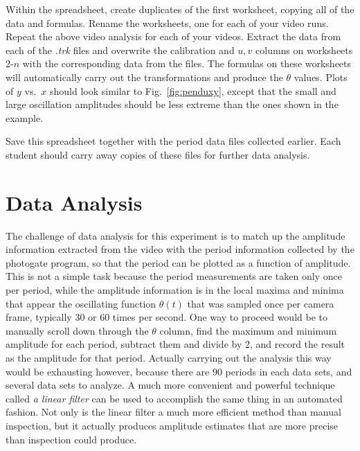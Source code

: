 \documentclass{revtex4}
\begin{document}
Within the spreadsheet, create duplicates of the first worksheet, copying
all of the data and formulas.  Rename the worksheets, one for each of your
video runs.  Repeat the above video analysis for each of your videos.
Extract the data from each of the {\em .trk} files and overwrite the
calibration and $u,v$ columns on worksheets 2-$n$ with the corresponding
data from the files.  The formulas on these worksheets will automatically
carry out the transformations and produce the $\theta$ values.  Plots of
$y$ vs.\ $x$ should look similar to Fig.~\ref{fig:penduxy}, except that
the small and large oscillation amplitudes should be less extreme than 
the ones shown in the example.

Save this spreadsheet together with the period data files collected earlier.
Each student should carry away copies of these files for further data analysis.

\section{Data Analysis}

The challenge of data analysis for this experiment is to match up the
amplitude information extracted from the video with the period information
collected by the photogate program, so that the period can be plotted as
a function of amplitude.  This is not a simple task because the period
measurements are taken only once per period, while the amplitude information
is in the local maxima and minima that appear the oscillating function
$\theta(t)$ that was sampled once per camera frame, typically 30 or 60
times per second.  One way to proceed would be to manually scroll down
through the $\theta$ column, find the maximum and minimum amplitude for
each period, subtract them and divide by 2, and record the result as the
amplitude for that period.  Actually carrying out the analysis this way
would be exhausting however, because there are 90 periods in each data
sets, and several data sets to analyze.  A much more convenient and
powerful technique called {\em a linear filter} can be used to accomplish
the same thing in an automated fashion.  Not only is the linear filter a
much more efficient method than manual inspection, but it actually produces
amplitude estimates that are more precise than inspection could produce.
\end{document}
